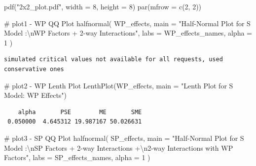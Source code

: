\documentclass[
  letterpaper,
  DIV=11,
  numbers=noendperiod]{scrartcl}
\newenvironment{Shaded}{\begin{snugshade}}{\end{snugshade}}
\newcommand{\AttributeTok}[1]{\textcolor[rgb]{0.40,0.45,0.13}{#1}}
\newcommand{\CommentTok}[1]{\textcolor[rgb]{0.37,0.37,0.37}{#1}}
\newcommand{\DecValTok}[1]{\textcolor[rgb]{0.68,0.00,0.00}{#1}}
\newcommand{\FunctionTok}[1]{\textcolor[rgb]{0.28,0.35,0.67}{#1}}
\newcommand{\NormalTok}[1]{\textcolor[rgb]{0.00,0.23,0.31}{#1}}
\newcommand{\SpecialCharTok}[1]{\textcolor[rgb]{0.37,0.37,0.37}{#1}}
\newcommand{\StringTok}[1]{\textcolor[rgb]{0.13,0.47,0.30}{#1}}
\begin{document}
\begin{Shaded}
\begin{Highlighting}[]
\FunctionTok{pdf}\NormalTok{(}\StringTok{"2x2\_plot.pdf"}\NormalTok{, }\AttributeTok{width =} \DecValTok{8}\NormalTok{, }\AttributeTok{height =} \DecValTok{8}\NormalTok{)}
\FunctionTok{par}\NormalTok{(}\AttributeTok{mfrow =} \FunctionTok{c}\NormalTok{(}\DecValTok{2}\NormalTok{, }\DecValTok{2}\NormalTok{))}

\CommentTok{\# plot1 {-} WP QQ Plot}
\FunctionTok{halfnormal}\NormalTok{(}
\NormalTok{  WP\_effects,}
  \AttributeTok{main =} \StringTok{"Half{-}Normal Plot for S Model :}\SpecialCharTok{\textbackslash{}n}\StringTok{WP Factors + 2{-}way Interactions"}\NormalTok{,}
  \AttributeTok{labs =}\NormalTok{ WP\_effects\_names,}
  \AttributeTok{alpha =} \DecValTok{1}
\NormalTok{)}
\end{Highlighting}
\end{Shaded}

\begin{verbatim}
simulated critical values not available for all requests, used conservative ones
\end{verbatim}

\begin{Shaded}
\begin{Highlighting}[]
\CommentTok{\# plot2 {-} WP Lenth Plot}
\FunctionTok{LenthPlot}\NormalTok{(WP\_effects, }\AttributeTok{main =} \StringTok{"Lenth Plot for S Model: WP Effects"}\NormalTok{)}
\end{Highlighting}
\end{Shaded}

\begin{verbatim}
    alpha       PSE        ME       SME 
 0.050000  4.645312 19.987167 50.026631 
\end{verbatim}

\begin{Shaded}
\begin{Highlighting}[]
\CommentTok{\# plot3 {-} SP QQ Plot}
\FunctionTok{halfnormal}\NormalTok{(}
\NormalTok{  SP\_effects,}
  \AttributeTok{main =} \StringTok{"Half{-}Normal Plot for S Model :}\SpecialCharTok{\textbackslash{}n}\StringTok{SP Factors + 2{-}way Interactions +}\SpecialCharTok{\textbackslash{}n}\StringTok{2{-}way Interactions with WP Factors"}\NormalTok{,}
  \AttributeTok{labs =}\NormalTok{ SP\_effects\_names,}
  \AttributeTok{alpha =} \DecValTok{1}
\NormalTok{)}
\end{Highlighting}
\end{Shaded}
\end{document}
